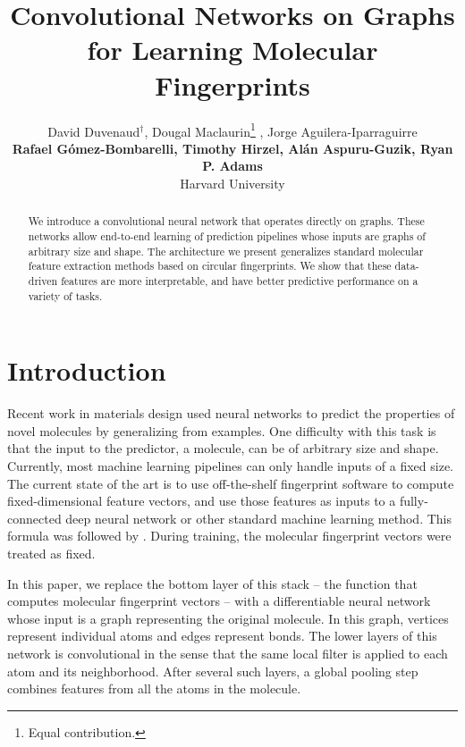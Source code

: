 \documentclass{article}
\title{Convolutional Networks on Graphs \\for Learning Molecular Fingerprints}
\author{
David Duvenaud$^\dagger$, Dougal Maclaurin\thanks{Equal contribution.} , Jorge Aguilera-Iparraguirre \\ {\bf Rafael G\'omez-Bombarelli, Timothy Hirzel, Al\'an Aspuru-Guzik, Ryan P. Adams}\\
Harvard University}
\newcommand{\citet}{\cite}
\begin{document}
\maketitle

\begin{abstract}
We introduce a convolutional neural network that operates directly on graphs.
These networks allow end-to-end learning of prediction pipelines whose inputs are graphs of arbitrary size and shape.
The architecture we present generalizes standard molecular feature extraction methods based on circular fingerprints.
We show that these data-driven features are more interpretable, and have better predictive performance on a variety of tasks.
\end{abstract}

\section{Introduction}
Recent work in materials design used neural networks to predict the properties of novel molecules by generalizing from examples.
One difficulty with this task is that the input to the predictor, a molecule, can be of arbitrary size and shape.
Currently, most machine learning pipelines can only handle inputs of a fixed size.
The current state of the art is to use off-the-shelf fingerprint software to compute fixed-dimensional feature vectors, and use those features as inputs to a fully-connected deep neural network or other standard machine learning method.
This formula was followed by \citet{unterthinerdeep, dahl2014multi, ramsundar2015massively}.
During training, the molecular fingerprint vectors were treated as fixed.

In this paper, we replace the bottom layer of this stack -- the function that computes molecular fingerprint vectors -- with a differentiable neural network whose input is a graph representing the original molecule.
In this graph, vertices represent individual atoms and edges represent bonds.
The lower layers of this network is convolutional in the sense that the same local filter is applied to each atom and its neighborhood.
After several such layers, a global pooling step combines features from all the atoms in the molecule.
\end{document}
